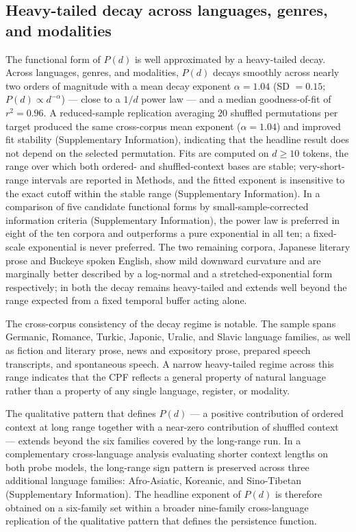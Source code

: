 \documentclass[11pt]{article}
\begin{document}
\subsection{Heavy-tailed decay across languages, genres, and modalities}

The functional form of $P(d)$ is well approximated by a heavy-tailed decay. Across
languages, genres, and modalities, $P(d)$ decays smoothly across nearly two orders of
magnitude with a mean decay exponent $\alpha=1.04$ (SD $=0.15$; $P(d)\propto d^{-\alpha}$)
--- close to a $1/d$ power law --- and a median goodness-of-fit of $r^2 = 0.96$. A
reduced-sample replication averaging $20$ shuffled permutations per target produced the same
cross-corpus mean exponent ($\alpha=1.04$) and improved fit stability (Supplementary Information),
indicating that the headline result does not depend on the selected permutation. Fits are computed on $d \geq 10$
tokens, the range over which both ordered- and shuffled-context bases are stable;
very-short-range intervals are reported in Methods, and the fitted exponent is insensitive to the
exact cutoff within the stable range (Supplementary Information). In a comparison of five candidate
functional forms by small-sample-corrected information criteria (Supplementary
Information), the power law is preferred in eight of the ten corpora and outperforms a
pure exponential in all ten; a fixed-scale exponential is never preferred. The two
remaining corpora, Japanese literary prose and Buckeye spoken English, show mild downward
curvature and are marginally better described by a log-normal and a stretched-exponential
form respectively; in both the decay remains heavy-tailed and extends well beyond the range
expected from a fixed temporal buffer acting alone.

The cross-corpus consistency of the decay regime is notable. The sample spans
Germanic, Romance, Turkic, Japonic, Uralic, and Slavic language families, as well as
fiction and literary prose, news and expository prose, prepared speech transcripts,
and spontaneous speech. A narrow heavy-tailed regime across this range indicates that
the CPF reflects a general property of natural language rather than a
property of any single language, register, or modality.

The qualitative pattern that defines $P(d)$ --- a positive contribution of ordered
context at long range together with a near-zero contribution of shuffled context ---
extends beyond the six families covered by the long-range run. In a complementary
cross-language analysis evaluating shorter context lengths on both probe models, the
long-range sign pattern is preserved across three additional language families:
Afro-Asiatic, Koreanic, and Sino-Tibetan (Supplementary Information). The headline
exponent of $P(d)$ is therefore obtained on a six-family set within a broader nine-family
cross-language replication of the qualitative pattern that defines the persistence
function.
\end{document}

